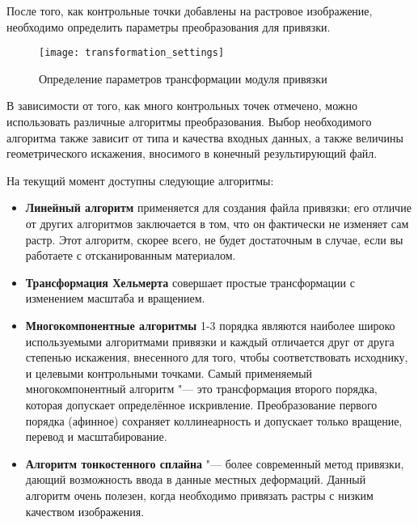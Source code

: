\label{georeferencer_transformation}

После того, как контрольные точки добавлены на растровое изображение,
необходимо определить параметры преобразования для привязки.

\begin{figure}[ht]
\centering
  \texttt{[image: transformation\_settings]}
  \caption{Определение параметров трансформации модуля привязки \wincaption}\label{fig:georef_transform}
\end{figure}


В зависимости от того, как много контрольных точек отмечено, можно
использовать различные алгоритмы преобразования. Выбор необходимого
алгоритма также зависит от типа и качества входных данных, а также
величины геометрического искажения, вносимого в конечный результирующий
файл.

На текущий момент доступны следующие алгоритмы:

\begin{itemize}[label=--]
\item \textbf{Линейный алгоритм} применяется для создания файла
привязки; его отличие от других алгоритмов заключается в том, что он
фактически не изменяет сам растр. Этот алгоритм, скорее всего, не будет
достаточным в случае, если вы работаете с отсканированным материалом.
\item \textbf{Трансформация Хельмерта} совершает простые трансформации
с изменением масштаба и вращением.
\item \textbf{Многокомпонентные алгоритмы} 1-3 порядка являются
наиболее широко используемыми алгоритмами привязки и каждый отличается
друг от друга степенью искажения, внесенного для того, чтобы
соответствовать исходнику, и целевыми контрольными точками. Самый
применяемый многокомпонентный алгоритм "--- это трансформация второго
порядка, которая допускает определённое искривление. Преобразование
первого порядка (афинное) сохраняет коллинеарность и допускает только
вращение, перевод и масштабирование.
\item \textbf{Алгоритм тонкостенного сплайна} "--- более современный
метод привязки, дающий возможность ввода в данные местных деформаций.
Данный алгоритм очень полезен, когда необходимо привязать растры с
низким качеством изображения.
\end{itemize}


